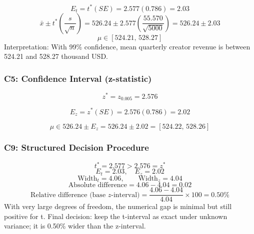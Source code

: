 \begin{ExamProblems}
		\[
		E_t=t^*(SE)=2.577(0.786)=2.03
		\]
		\[
		\bar{x}\pm t^*\left(\frac{s}{\sqrt{n}}\right)=526.24\pm 2.577\left(\frac{55.570}{\sqrt{5000}}\right)=526.24\pm 2.03
		\]
		\[
		\mu\in[524.21,\,528.27]
		\]
		Interpretation: With 99\% confidence, mean quarterly creator revenue is between 524.21 and 528.27 thousand USD.

		\subsubsection*{C5: Confidence Interval (z-statistic)}
		\[
		z^*=z_{0.005}=2.576
		\]

		\[
		E_z=z^*(SE)=2.576(0.786)=2.02
		\]

		\[
		\mu\in 526.24\pm E_z=526.24\pm 2.02=[524.22,\,528.26]
		\]

		\subsubsection*{C9: Structured Decision Procedure}
		\[
		t^*=2.577>2.576=z^*
		\]
		\[
		E_t=2.03,\quad E_z=2.02
		\]
		\[
		\text{Width}_t=4.06,\qquad \text{Width}_z=4.04
		\]
		\[
		\text{Absolute difference}=4.06-4.04=0.02
		\]
		\[
		\text{Relative difference (base }z\text{-interval)}=\frac{4.06-4.04}{4.04}\times 100=0.50\%
		\]
		With very large degrees of freedom, the numerical gap is minimal but still positive for t.
		Final decision: keep the t-interval as exact under unknown variance; it is 0.50\% wider than the z-interval.
	\end{ExamProblems}


